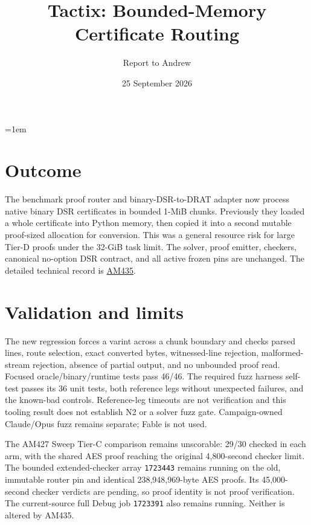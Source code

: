 \documentclass[10pt]{article}
\title{Tactix: Bounded-Memory Certificate Routing}
\author{Report to Andrew}
\date{25 September 2026}
\begin{document}
\maketitle
\vspace{-1.5em}
\emergencystretch=1em

\section*{Outcome}
The benchmark proof router and binary-DSR-to-DRAT adapter now process native
binary DSR certificates in bounded 1-MiB chunks. Previously they loaded a
whole certificate into Python memory, then copied it into a second mutable
proof-sized allocation for conversion. This was a general resource risk for
large Tier-D proofs under the 32-GiB task limit. The solver, proof emitter,
checkers, canonical no-option DSR contract, and all active frozen pins are
unchanged. The detailed technical record is
\href{../../benchmarks/reports/2026-09-25-am435-bounded-binary-dsr-routing.md}{AM435}.

\section*{Validation and limits}
The new regression forces a varint across a chunk boundary and checks parsed
lines, route selection, exact converted bytes, witnessed-line rejection,
malformed-stream rejection, absence of partial output, and no unbounded proof
read. Focused oracle/binary/runtime tests pass 46/46. The required fuzz
harness self-test passes its 36 unit tests, both reference legs without
unexpected failures, and the known-bad controls. Reference-leg timeouts are
not verification and this tooling result does not establish N2 or a solver
fuzz gate. Campaign-owned Claude/Opus fuzz remains separate; Fable is not used.

The AM427 Sweep Tier-C comparison remains unscorable: 29/30 checked in each
arm, with the shared AES proof reaching the original 4,800-second checker
limit. The bounded extended-checker array \texttt{1723443} remains running on
the old, immutable router pin and identical 238,948,969-byte AES proofs. Its
45,000-second checker verdicts are pending, so proof identity is not proof
verification. The current-source full Debug job \texttt{1723391} also remains
running. Neither is altered by AM435.
\end{document}
